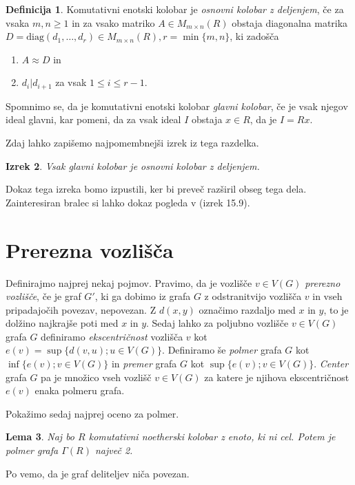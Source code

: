 \documentclass[a4paper, 12pt]{amsart}
\theoremstyle{definition} %
\newtheorem{definicija}{Definicija}[section]
\theoremstyle{plain} %
\newtheorem{lema}[definicija]{Lema}
\newtheorem{izrek}[definicija]{Izrek}
\begin{document}
\begin{definicija}
Komutativni enotski kolobar je \emph{osnovni kolobar z deljenjem}, če za vsaka $m,n\ge 1$ in za vsako matriko $A\in M_{m\times n}(R)$ obstaja diagonalna matrika $D= \textrm{diag}(d_1,\dots,d_r) \in M_{m\times n} (R), r = \min\{m,n\}$, ki zadošča
\begin{enumerate}
\item $A\approx D$ in
\item $d_i | d_{i+1}$ za vsak $1 \le i \le r-1$.
\end{enumerate} 
\end{definicija}
Spomnimo se, da je komutativni enotski kolobar \emph{glavni kolobar}, če je vsak njegov ideal glavni, kar pomeni, da za vsak ideal $I$ obstaja $x\in R$, da je $I=Rx$. 

Zdaj lahko zapišemo najpomembnejši izrek iz tega razdelka.
\begin{izrek}
\label{PIR-elementaryDivisionRing}
Vsak glavni kolobar je osnovni kolobar z deljenjem.
\end{izrek}
Dokaz tega izreka bomo izpustili, ker bi preveč razširil obseg tega dela. Zainteresiran bralec si lahko dokaz pogleda v \cite{Brown} (izrek 15.9).

\section{Prerezna vozlišča}
Definirajmo najprej nekaj pojmov. Pravimo, da je vozlišče $v\in V(G)$ \emph{prerezno vozlišče}, če je graf $G'$, ki ga dobimo iz grafa $G$ z odstranitvijo vozlišča $v$ in vseh pripadajočih povezav, nepovezan. Z $d(x,y)$ označimo razdaljo med $x$ in $y$, to je dolžino najkrajše poti med $x$ in $y$. Sedaj lahko za poljubno vozlišče $v \in V(G)$ grafa $G$ definiramo \emph{ekscentričnost} vozlišča $v$ kot $e(v) = \sup\{d(v,u);u\in V(G)\}$. Definiramo še \emph{polmer} grafa $G$ kot $\inf\{e(v); v\in V(G)\}$ in \emph{premer} grafa $G$ kot $\sup\{ e(v); v\in V(G)\}$.  \emph{Center} grafa $G$ pa je množico vseh vozlišč $v\in V(G)$ za katere je njihova ekscentričnost $e(v)$ enaka polmeru grafa.

Pokažimo sedaj najprej oceno za polmer.

\begin{lema}
\label{radij}
Naj bo $R$ komutativni noetherski kolobar z enoto, ki ni cel. Potem je polmer grafa $\Gamma(R)$ največ 2.
\end{lema}

\proof
Po \cite{diploma} vemo, da je graf deliteljev niča povezan.
\end{document}
